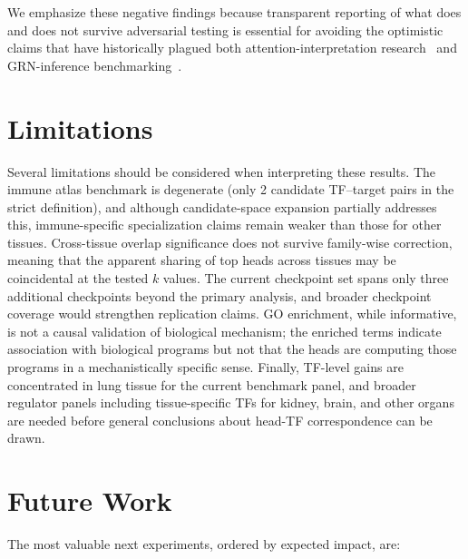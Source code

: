 \documentclass[11pt]{article}
\begin{document}
We emphasize these negative findings because transparent reporting of what does and does not survive adversarial testing is essential for avoiding the optimistic claims that have historically plagued both attention-interpretation research~\cite{jain2019attention} and GRN-inference benchmarking~\cite{pratapa2020beeline}.


\section{Limitations}

Several limitations should be considered when interpreting these results. The immune atlas benchmark is degenerate (only 2 candidate TF--target pairs in the strict definition), and although candidate-space expansion partially addresses this, immune-specific specialization claims remain weaker than those for other tissues. Cross-tissue overlap significance does not survive family-wise correction, meaning that the apparent sharing of top heads across tissues may be coincidental at the tested $k$ values. The current checkpoint set spans only three additional checkpoints beyond the primary analysis, and broader checkpoint coverage would strengthen replication claims. GO enrichment, while informative, is not a causal validation of biological mechanism; the enriched terms indicate association with biological programs but not that the heads are computing those programs in a mechanistically specific sense. Finally, TF-level gains are concentrated in lung tissue for the current benchmark panel, and broader regulator panels including tissue-specific TFs for kidney, brain, and other organs are needed before general conclusions about head-TF correspondence can be drawn.


\section{Future Work}

The most valuable next experiments, ordered by expected impact, are:
\end{document}
